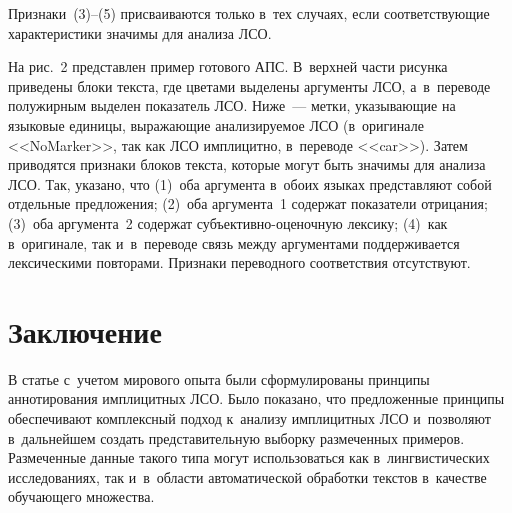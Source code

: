 \begin{multicols}{2}
Признаки~(3)--(5) присваиваются только в~тех случаях, если соответствующие 
характеристики значимы для анализа ЛСО.

На рис.~2 представлен пример готового АПС. В~верхней части рисунка 
приведены блоки текста, где цветами выделены аргументы ЛСО, 
а~в~переводе полужирным выделен показатель ЛСО. Ниже~--- метки, 
указывающие на языковые единицы, выражающие анализируемое ЛСО 
(в~оригинале <<NoMarker>>, так как ЛСО имплицитно, в~переводе <<car>>). 
Затем приводятся признаки блоков текста, которые могут быть значимы для 
анализа ЛСО. Так, указано, что (1)~оба аргумента в~обоих языках 
представляют собой отдельные предложения; (2)~оба аргумента~1 содержат 
показатели отрицания; (3)~оба аргумента~2 содержат  
субъ\-ек\-тив\-но-оце\-ноч\-ную лексику; (4)~как в~оригинале, так 
и~в~переводе связь между аргументами поддерживается лексическими 
повторами. Признаки переводного соответствия отсутствуют.



\section{Заключение}

В статье с~учетом мирового опыта были сформулированы принципы 
аннотирования имплицитных ЛСО. Было показано, что предложенные 
принципы обеспечивают комплексный подход к~анализу имплицитных ЛСО 
и~позволяют в~дальнейшем создать представительную выборку размеченных 
примеров. Размеченные данные такого типа могут использоваться как 
в~лингвистических исследованиях, так и~в~об\-ласти автоматической 
обработки текстов в~качестве обучающего множества.


\end{multicols}
